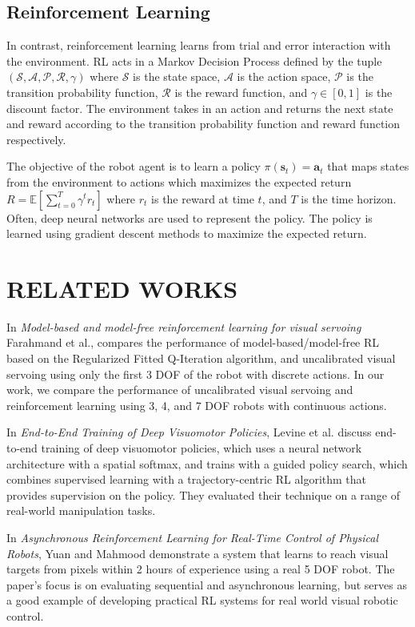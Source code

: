 \documentclass[letterpaper, 10 pt, conference]{ieeeconf}  %
\begin{document}
\subsection{Reinforcement Learning}

In contrast, reinforcement learning learns from trial and error interaction with
the environment. RL acts in a Markov Decision Process defined by the tuple
$(\mathcal{S}, \mathcal{A}, \mathcal{P}, \mathcal{R}, \gamma)$ where $\mathcal{S}$ is
the state space, $\mathcal{A}$ is the action space, $\mathcal{P}$ is the transition
probability function, $\mathcal{R}$ is the reward function, and $\gamma \in [0, 1]$ is the discount
factor. The environment takes in an action and returns the next state and reward
according to the transition probability function and reward function respectively.

The objective of the robot agent is to learn a policy $\pi(\mathbf{s}_t) =
\mathbf{a}_t$ that maps states from the environment to actions which maximizes
the expected return $R = \mathbb{E}[\sum_{t=0}^T \gamma^t r_t]$ where $r_t$ is
the reward at time $t$, and $T$ is the time horizon. Often, deep neural networks are used to represent the policy.
The policy is learned using gradient descent methods to maximize the expected
return.

\section{RELATED WORKS} \label{Related Works} In \emph{Model-based and
model-free reinforcement learning for visual servoing} Farahmand et al.,
compares the performance of model-based/model-free RL based on the Regularized
Fitted Q-Iteration algorithm, and uncalibrated visual servoing using only the
first 3 DOF of the robot with discrete actions. \cite{Farahmand2009} In our
work, we compare the performance of uncalibrated visual servoing and
reinforcement learning using 3, 4, and 7 DOF robots with continuous actions.

In \emph{End-to-End Training of Deep Visuomotor Policies}, Levine et al. discuss
end-to-end training of deep visuomotor policies, which uses a neural network
architecture with a spatial softmax, and trains with a guided policy search,
which combines supervised learning with a trajectory-centric RL algorithm that
provides supervision on the policy. \cite{Levine15} They evaluated their
technique on a range of real-world manipulation tasks.

In \emph{Asynchronous Reinforcement Learning for Real-Time Control of Physical
Robots}, Yuan and Mahmood demonstrate a system that learns to reach visual
targets from pixels within 2 hours of experience using a real 5 DOF robot.
\cite{Yuan2022} The paper's focus is on evaluating sequential and asynchronous
learning, but serves as a good example of developing practical RL systems for
real world visual robotic control.
\end{document}
